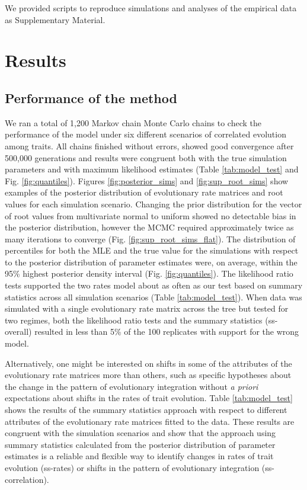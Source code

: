 We provided scripts to reproduce simulations and analyses of the empirical data as Supplementary Material.

\section{Results}

\subsection{Performance of the method}

We ran a total of 1,200 Markov chain Monte Carlo chains to check the performance of the model under six different scenarios of correlated evolution among traits. All chains finished without errors, showed good convergence after 500,000 generations and results were congruent both with the true simulation parameters and with maximum likelihood estimates (Table \ref{tab:model_test} and Fig. \ref{fig:quantiles}). Figures \ref{fig:posterior_sims} and \ref{fig:sup_root_sims} show examples of the posterior distribution of evolutionary rate matrices and root values for each simulation scenario. Changing the prior distribution for the vector of root values from multivariate normal to uniform showed no detectable bias in the posterior distribution, however the MCMC required approximately twice as many iterations to converge (Fig. \ref{fig:sup_root_sims_flat}). The distribution of percentiles for both the MLE and the true value for the simulations with respect to the posterior distribution of parameter estimates were, on average, within the 95\% highest posterior density interval (Fig. \ref{fig:quantiles}). The likelihood ratio tests supported the two rates model about as often as our test based on summary statistics across all simulation scenarios (Table \ref{tab:model_test}). When data was simulated with a single evolutionary rate matrix across the tree but tested for two regimes, both the likelihood ratio tests and the summary statistics (ss-overall) resulted in less than 5\% of the 100 replicates with support for the wrong model.

Alternatively, one might be interested on shifts in some of the attributes of the evolutionary rate matrices more than others, such as specific hypotheses about the change in the pattern of evolutionary integration without \textit{a priori} expectations about shifts in the rates of trait evolution. Table \ref{tab:model_test} shows the results of the summary statistics approach with respect to different attributes of the evolutionary rate matrices fitted to the data. These results are congruent with the simulation scenarios and show that the approach using summary statistics calculated from the posterior distribution of parameter estimates is a reliable and flexible way to identify changes in rates of trait evolution (ss-rates) or shifts in the pattern of evolutionary integration (ss-correlation).

